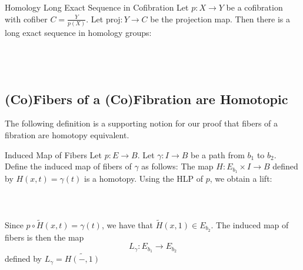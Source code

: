 \documentclass[a4paper]{article}
\begin{document}
\begin{thm}{Homology Long Exact Sequence in Cofibration}{} Let $p:X\to Y$ be a cofibration with cofiber $C=\frac{Y}{p(X)}$. Let $\text{proj}:Y\to C$ be the projection map. Then there is a long exact sequence in homology groups: \\~\\
\\~\\
\end{thm}

\subsection{(Co)Fibers of a (Co)Fibration are Homotopic}
The following definition is a supporting notion for our proof that fibers of a fibration are homotopy equivalent. 

\begin{defn}{Induced Map of Fibers}{} Let $p:E\to B$. Let $\gamma:I\to B$ be a path from $b_1$ to $b_2$. Define the induced map of fibers of $\gamma$ as follows: The map $H:E_{b_1}\times I\to B$ defined by $H(x,t)=\gamma(t)$ is a homotopy. Using the HLP of $p$, we obtain a lift: \\~\\
 \\~\\
Since $p\circ\widetilde{H}(x,t)=\gamma(t)$, we have that $\widetilde{H}(x,1)\in E_{b_2}$. The induced map of fibers is then the map $$L_\gamma:E_{b_1}\to E_{b_2}$$ defined by $L_\gamma=\widetilde{H(-,1)}$
\end{defn}
\end{document}
